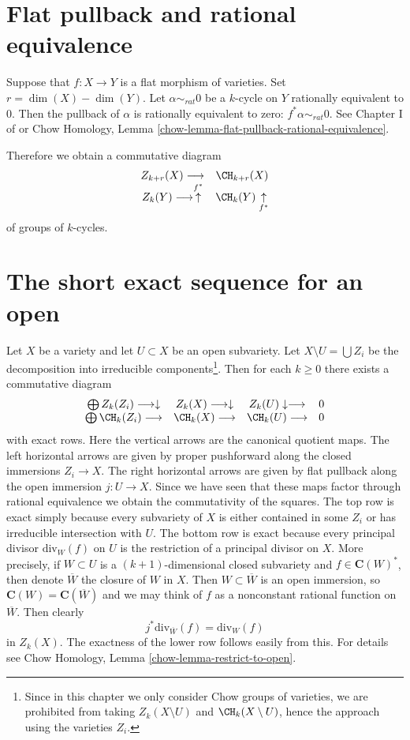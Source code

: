 \section{Flat pullback and rational equivalence}
\label{intersection-section-flat-pullback-and-rational-equivalence}
Suppose that $f : X \to Y$ is a flat morphism of varieties.
Set $r = \dim(X) - \dim(Y)$.
Let $\alpha \sim_{rat} 0$ be a $k$-cycle on
$Y$ rationally equivalent to $0$. Then the pullback
of $\alpha$ is rationally equivalent to zero:
$f^* \alpha \sim_{rat} 0$. See Chapter I of \cite{F} or
Chow Homology, Lemma \ref{chow-lemma-flat-pullback-rational-equivalence}.

\medskip\noindent
Therefore we obtain a commutative diagram
$$
\begin{array}{cc}Z_{k + r}(X) \longrightarrow & \CH_{k + r}(X) \\ Z_k(Y) \longrightarrow\overset{f^*}{\uparrow} & \CH_k(Y) \underset{f^*}{\uparrow}\end{array}
$$
of groups of $k$-cycles.

\section{The short exact sequence for an open}
\label{intersection-section-ses}
Let $X$ be a variety and let $U \subset X$ be an open subvariety.
Let $X \setminus U = \bigcup Z_i$ be the decomposition into irreducible
components\footnote{Since in this chapter we only consider Chow groups
of varieties, we are prohibited from taking $Z_k(X \setminus U)$
and $\CH_k(X \setminus U)$, hence the approach using the varieties $Z_i$.}.
Then for each $k \geq 0$ there exists a commutative diagram
$$
\begin{array}{cccc}\bigoplus Z_k(Z_i) \longrightarrow\downarrow & Z_k(X) \longrightarrow\downarrow & Z_k(U) \downarrow\longrightarrow & 0 \\ \bigoplus \CH_k(Z_i) \longrightarrow & \CH_k(X) \longrightarrow & \CH_k(U) \longrightarrow & 0\end{array}
$$
with exact rows. Here the vertical arrows are the canonical quotient maps.
The left horizontal arrows are given by proper pushforward along the closed
immersions $Z_i \to X$. The right horizontal arrows are given by flat
pullback along the open immersion $j : U \to X$. Since we have seen that
these maps factor through rational equivalence we obtain the commutativity
of the squares. The top row is exact simply because every subvariety
of $X$ is either contained in some $Z_i$ or has irreducible intersection
with $U$. The bottom row is exact because every principal divisor
$\text{div}_W(f)$ on $U$ is the restriction of a principal divisor on $X$.
More precisely, if $W \subset U$ is a $(k + 1)$-dimensional closed subvariety
and $f \in \mathbf{C}(W)^*$, then denote $\overline{W}$ the closure of $W$
in $X$. Then $W \subset \overline{W}$ is an open immersion, so
$\mathbf{C}(W) = \mathbf{C}(\overline{W})$ and we may think of $f$
as a nonconstant rational function on $\overline{W}$. Then clearly
$$
j^*\text{div}_{\overline{W}}(f) = \text{div}_W(f)
$$
in $Z_k(X)$. The exactness of the lower row follows easily from this.
For details see Chow Homology, Lemma \ref{chow-lemma-restrict-to-open}.


